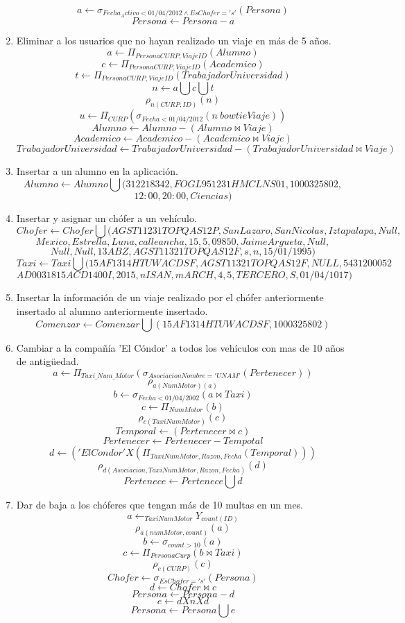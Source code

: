 \documentclass{article}
\begin{document}
\begin{enumerate}
	$$a \leftarrow \sigma _{Fecha_Activo < 01/04/2012 \wedge EsChofer = 's'}(Persona)$$
	$$Persona \leftarrow Persona - a$$
	\item Eliminar a los usuarios que no hayan realizado un viaje en más de 5 años.\\
	$$a \leftarrow \Pi_{PersonaCURP,ViajeID}(Alumno)$$
	$$c \leftarrow \Pi_{PersonaCURP,ViajeID}(Academico)$$
	$$t \leftarrow \Pi_{PersonaCURP,ViajeID}(TrabajadorUniversidad)$$
	$$n \leftarrow a \bigcup c \bigcup t$$	
	$$\rho_{n(CURP,ID)}(n)$$
	$$u \leftarrow \Pi _{CURP}(\sigma _{Fecha < 01/04/2012}(n \ bowtie Viaje))$$
	$$Alumno \leftarrow Alumno - (Alumno \bowtie Viaje)$$
	$$Academico \leftarrow Academico - (Academico \bowtie Viaje)$$
	$$TrabajadorUniversidad \leftarrow TrabajadorUniversidad - (TrabajadorUniversidad \bowtie Viaje)$$		
	\item Insertar a un alumno en la aplicación.\\
	$$Alumno \leftarrow Alumno \bigcup (312218342,FOGL951231HMCLNS01,1000325802, $$
	$$12:00,20:00,Ciencias)$$
	\item Insertar y asignar un chófer a un vehículo.\\
	$$Chofer \leftarrow Chofer \bigcup (AGST11231TOPQAS12P,San Lazaro,San Nicolas,Iztapalapa,Null,$$
	$$Mexico,Estrella,Luna,calle ancha,15,5,09850,Jaime Argueta, Null,$$
$$Null,Null,13ABZ,AGST11321TOPQAS12F,s,n,15/01/1995)$$
	$$Taxi \leftarrow Taxi \bigcup (15AF1314HTUWACDSF,AGST11321TOPQAS12F,NULL,5431200052$$
$$AD0031815ACD1400I,2015,nISAN,mARCH,4,5,TERCERO,S,01/04/1017)$$
	\item Insertar la información de un viaje realizado por el chófer anteriormente insertado al alumno anteriormente insertado.\\
	$$Comenzar \leftarrow Comenzar \bigcup (15AF1314HTUWACDSF,1000325802)$$
	\item  Cambiar a la compañía 'El Cóndor' a todos los vehículos con mas de 10 años de antigüedad.\\
	$$a \leftarrow \Pi _{Taxi\_Num\_Motor}(\sigma_{AsociacionNombre='UNAM'}(Pertenecer))$$
	$$\rho_{a(NumMotor)(a)}$$
	$$b \leftarrow \sigma _{Fecha < 01/04/2002}(a \bowtie Taxi)$$
	$$c \leftarrow \Pi _{NumMotor}(b)$$
	$$\rho_{c(TaxiNumMotor)}(c)$$
	$$Temporal \leftarrow (Pertenecer \bowtie c)$$
	$$Pertenecer \leftarrow Pertenecer - Tempotal$$
	$$d \leftarrow ('El Condor' X (\Pi _{TaxiNumMotor,Razon,Fecha}(Temporal)))$$
	$$\rho_{d(Asociacion,TaxiNumMotor,Razon,Fecha)}(d)$$
	$$Pertenece \leftarrow Pertenece \bigcup d$$
	\item Dar de baja a los chóferes que tengan más de 10 multas en un mes.\\
	$$a \leftarrow _{TaxiNumMotor}Y_{count(ID)}$$
	$$\rho_{a(numMotor,count)}(a)$$
	$$b \leftarrow \sigma_{count > 10}(a)$$
	$$c \leftarrow \Pi_{PersonaCurp}(b \bowtie Taxi)$$
	$$\rho_{c(CURP)}(c)$$
	$$Chofer \leftarrow \sigma _{EsChofer = 's'}(Persona)$$
	$$d \leftarrow Chofer \bowtie c$$
	$$Persona \leftarrow Persona - d$$
	$$e \leftarrow d X n X d $$
	$$Persona \leftarrow Persona\bigcup e$$	
\end{enumerate}
\end{document}
